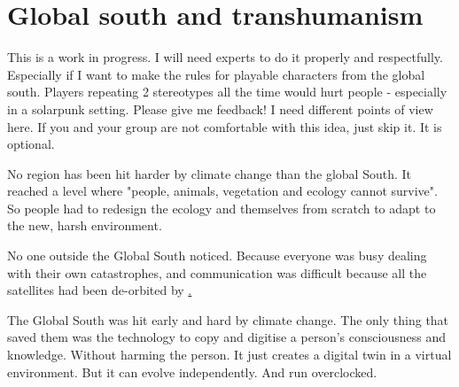 




\section{Global south and transhumanism}
\label{sec:Transhumanism}
\label{sec:Global South}

\begin{warning}
    This is a work in progress. I will need experts to do it properly and respectfully. Especially if I want to make the rules for playable characters from the global south. Players repeating 2 stereotypes all the time would hurt people - especially in a solarpunk setting.
    Please give me feedback! I need different points of view here.
    If you and your group are not comfortable with this idea, just skip it. It is optional.
\end{warning}

No region has been hit harder by climate change than the global South. It reached a level where "people, animals, vegetation and ecology cannot survive". So people had to redesign the ecology and themselves from scratch to adapt to the new, harsh environment.

No one outside the Global South noticed. Because everyone was busy dealing with their own catastrophes, and communication was difficult because all the satellites had been de-orbited by \hyperref[sec: Kessler Syndrome].

The Global South was hit early and hard by climate change. The only thing that saved them was the technology to copy and digitise a person's consciousness and knowledge. Without harming the person. It just creates a digital twin in a virtual environment.
But it can evolve independently. And run overclocked.

